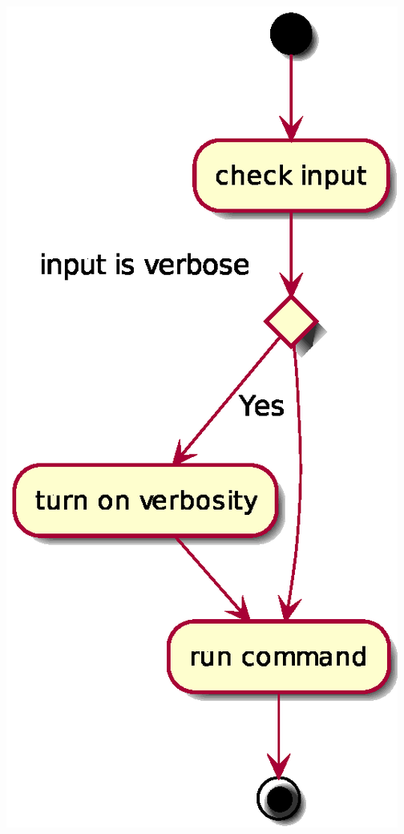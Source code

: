 \begin{center}

\begin{DoxyImageNoCaption}  \mbox{\includegraphics{inline_umlgraph_2}}
\end{DoxyImageNoCaption}
\end{center}



